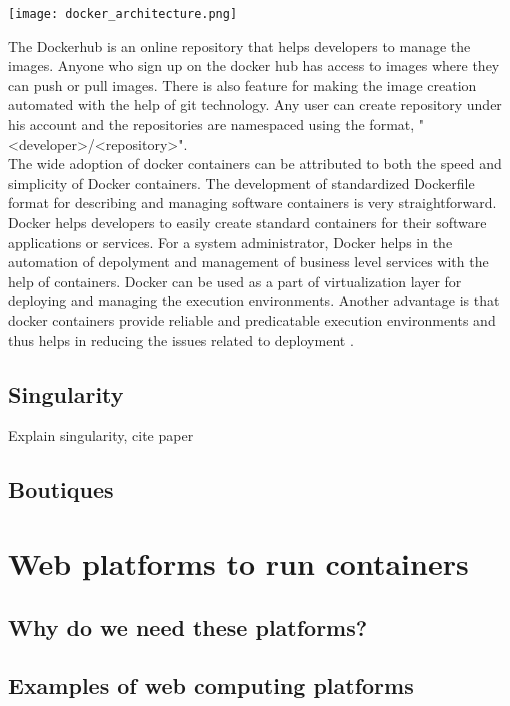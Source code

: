 \begin{center}
\texttt{[image: docker\_architecture.png]}
\label{fig:docker_architecture}
\end{center}

The Dockerhub is an online repository that helps developers to manage the images. Anyone who sign up on the docker hub has access to images where they can push or pull images. There is also feature for making the image creation automated with the help of git technology. Any user can create repository under his account and the repositories are namespaced using the format, "\textless developer\textgreater/\textless repository\textgreater"\cite{7742298}.\\

The wide adoption of docker containers can be attributed to both the speed and simplicity of Docker containers. The development of standardized Dockerfile format for describing and managing software containers is very straightforward. Docker helps developers to easily create standard containers for their software applications or services. For a system administrator, Docker helps in the automation of depolyment and management of business level services with the help of containers. Docker can be used as a part of virtualization layer for deploying and managing the execution environments. Another advantage is that docker containers provide reliable and predicatable execution environments and thus helps in reducing the issues related to deployment \cite{DBLP:journals/corr/MorrisVHM17}.

 
 
\subsection{Singularity}
Explain singularity, cite paper
\subsection{Boutiques}

\section{Web platforms to run containers}
\subsection{Why do we need these platforms?}
\subsection{Examples of web computing platforms}
